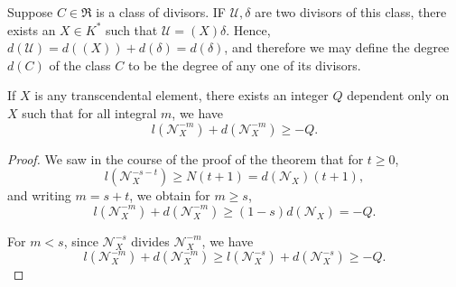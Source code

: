 \begin{corollary}\label{chap6:sec11:coro2}%
  Suppose $C \in \mathfrak{R}$ is a class of divisors. IF
  $\mathscr{U}, \delta$ are two divisors of this class, there exists
  an $X \in K^*$ such that $\mathscr{U} = (X) \delta$. Hence,\pageoriginale\
  $d(\mathscr{U}) = d((X)) + d(\delta) = d(\delta)$, and therefore we
  may define the degree $d(C)$ of the class $C$ to be the degree of
  any one of its divisors. 
\end{corollary}	

\begin{corollary}\label{chap6:sec11:coro3}%
  If $X$ is any transcendental element, there exists an integer $Q$
  dependent only on $X$ such that for all integral $m$, we have 
  $$
  l(\mathscr{N}^{-m}_X) + d(\mathscr{N}^{-m}_X) \ge -Q .
  $$
\end{corollary}

\begin{proof}
  We saw in the course of the proof of the theorem that for $t \ge 0$,
  $$
  l(\mathscr{N}^{-s-t}_X) \ge N(t+1) = d(\mathscr{N}_X) (t+1) ,
  $$
  and writing $m = s + t$, we obtain for $m \ge s$,
  $$
  l(\mathscr{N}_X^{-m}) + d(\mathscr{N}^{-m}_X) \ge (1-s) d(\mathscr{N}_X) = -Q .
  $$
  
  For $m < s$, since $\mathscr{N}^{-s}_X$ divides $\mathscr{N}^{-m}_X$, we have 
  $$
  l(\mathscr{N}_X^{-m}) + d(\mathscr{N}^{-m}_X) \ge
  l(\mathscr{N}_X^{-s}) + d(\mathscr{N}_X^{-s}) \ge -Q . 
  $$
\end{proof}
